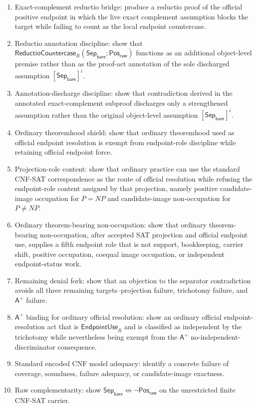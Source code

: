\documentclass[11pt]{article}
\theoremstyle{definition}
\theoremstyle{remark}
\newcommand{\PosRaw}{\mathsf{Pos}_{\mathsf{raw}}}
\newcommand{\SepBare}{\mathsf{Sep}_{\mathsf{bare}}}
\newcommand{\Aplus}{\mathsf{A}^{+}}
\newcommand{\EndpointUse}{\mathsf{EndpointUse}}
\newcommand{\ReductioCountercase}{\mathsf{ReductioCountercase}}
\begin{document}
\begin{enumerate}
\item Exact-complement reductio bridge: produce a reductio proof of the official positive endpoint in which the live exact complement assumption blocks the target while failing to count as the local endpoint countercase.
\item Reductio annotation discipline: show that \(\ReductioCountercase_R(\SepBare;\PosRaw)\) functions as an additional object-level premise rather than as the proof-act annotation of the sole discharged assumption \([\SepBare]^i\).
\item Annotation-discharge discipline: show that contradiction derived in the annotated exact-complement subproof discharges only a strengthened assumption rather than the original object-level assumption \([\SepBare]^i\).
\item Ordinary theoremhood shield: show that ordinary theoremhood used as official endpoint resolution is exempt from endpoint-role discipline while retaining official endpoint force.
\item Projection-role content: show that ordinary practice can use the standard CNF-SAT correspondence as the route of official resolution while refusing the endpoint-role content assigned by that projection, namely positive candidate-image occupation for \(P=NP\) and candidate-image non-occupation for \(P\neq NP\).
\item Ordinary theorem-bearing non-occupation: show that ordinary theorem-bearing non-occupation, after accepted SAT projection and official endpoint use, supplies a fifth endpoint role that is not support, bookkeeping, carrier shift, positive occupation, coequal image occupation, or independent endpoint-status work.
\item Remaining denial fork: show that an objection to the separator contradiction avoids all three remaining targets--projection failure, trichotomy failure, and \(\Aplus\) failure.
\item \(\Aplus\) binding for ordinary official resolution: show an ordinary official endpoint-resolution act that is \(\EndpointUse_R\) and is classified as independent by the trichotomy while nevertheless being exempt from the \(\Aplus\) no-independent-discriminator consequence.
\item Standard encoded CNF model adequacy: identify a concrete failure of coverage, soundness, failure adequacy, or candidate-image exactness.
\item Raw complementarity: show \(\SepBare\not\leftrightarrow\neg\PosRaw\) on the unrestricted finite CNF-SAT carrier.

\end{enumerate}
\end{document}
